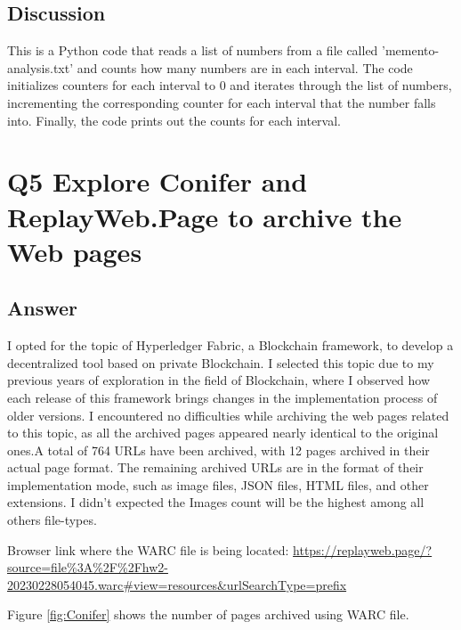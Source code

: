 \documentclass[12pt]{article}
\begin{document}
\subsection*{Discussion}
This is a Python code that reads a list of numbers from a file called 'memento-analysis.txt' and counts how many numbers are in each interval. The code initializes counters for each interval to 0 and iterates through the list of numbers, incrementing the corresponding counter for each interval that the number falls into. Finally, the code prints out the counts for each interval.


\section*{Q5 Explore Conifer and ReplayWeb.Page to archive the Web pages}

\subsection*{Answer}




I opted for the topic of Hyperledger Fabric, a Blockchain framework, to develop a decentralized tool based on private Blockchain. I selected this topic due to my previous years of exploration in the field of Blockchain, where I observed how each release of this framework brings changes in the implementation process of older versions. I encountered no difficulties while archiving the web pages related to this topic, as all the archived pages appeared nearly identical to the original ones.A total of 764 URLs have been archived, with 12 pages archived in their actual page format. The remaining archived URLs are in the format of their implementation mode, such as image files, JSON files, HTML files, and other extensions. I didn't expected the Images count will be the highest among all others file-types. 

Browser link where the WARC file is being located: \url{https://replayweb.page/?source=file%3A%2F%2Fhw2-20230228054045.warc#view=resources&urlSearchType=prefix}

Figure \ref{fig:Conifer} shows the number of pages archived using WARC file.
\end{document}
